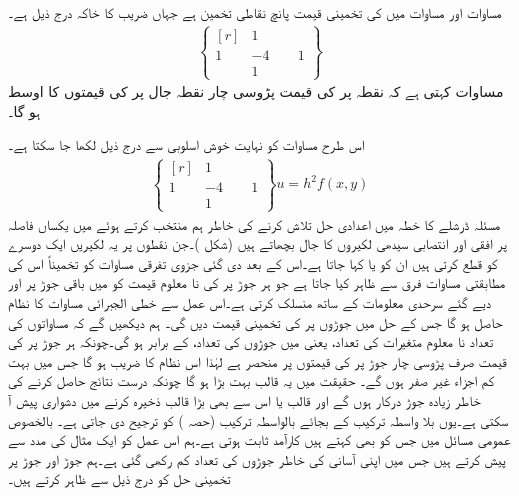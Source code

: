 مساوات  اور مساوات  میں  کی تخمینی قیمت پانچ نقاطی تخمین ہے جہاں   ضریب  کا خاکہ درج ذیل ہے۔
\begin{align}\label{مساوات_اعدادی_جزوی_عمومی_ح}
\left \{ \begin{matrix*}[r] &1&\\1&-4&\phantom{-}1\\&1& \end{matrix*}\right \}
\end{align}
مساوات  کہتی ہے کہ نقطہ  پر  کی قیمت  پڑوسی چار نقطہ جال پر  کی قیمتوں کا اوسط ہو گا۔

اس طرح مساوات  کو نہایت خوش اسلوبی سے درج ذیل لکھا جا سکتا ہے۔ 
\begin{align*}
\left \{ \begin{matrix*}[r] &1&\\1&-4&\phantom{-}1\\&1& \end{matrix*}\right \}u=h^2f(x,y)
\end{align*}
مسئلہ ڈرشلے  کا خطہ  میں اعدادی حل تلاش کرنے کی خاطر  ہم  منتخب کرتے ہوئے  میں  یکساں  فاصلہ پر افقی اور انتصابی  سیدھی لکیروں کا جال بچھاتے ہیں (شکل )۔جن نقطوں پر یہ لکیریں ایک دوسرے کو قطع کرتی ہیں ان  کو   یا  کہا جاتا ہے۔اس کے بعد دی گئی جزوی تفرقی مساوات کو تخمیناً اس کی مطابقتی مساوات فرق سے ظاہر کیا جاتا ہے جو ہر جوڑ پر  کی نا معلوم قیمت کو  میں باقی جوڑ پر اور دیے گئے سرحدی معلومات کے ساتھ منسلک کرتی ہے۔اس عمل سے خطی الجبرائی مساوات کا نظام حاصل ہو گا جس کے حل  میں  جوڑوں پر  کی تخمینی قیمت دیں گی۔ ہم دیکھیں گے کہ مساواتوں کی تعداد نا معلوم متغیرات کی تعداد، یعنی  میں جوڑوں کی تعداد، کے برابر ہو گی۔چونکہ ہر جوڑ پر  کی قیمت صرف پڑوسی چار جوڑ پر  کی قیمتوں پر منحصر ہے لہٰذا اس نظام کا  ضریب   ہو گا جس میں بہت کم اجزاء غیر صفر ہوں گے۔ حقیقت میں یہ قالب بہت بڑا ہو گا چونکہ درست نتائج حاصل کرنے کی خاطر زیادہ جوڑ درکار ہوں گے اور  قالب یا اس سے بھی بڑا قالب ذخیرہ کرنے میں دشواری پیش آ سکتی ہے۔یوں بلا واسطہ ترکیب کے بجائے  بالواسطہ ترکیب (حصہ ) کو ترجیح دی جاتی ہے۔ بالخصوص عمومی مسائل میں   جس کو  بھی کہتے ہیں کارآمد ثابت ہوتی ہے۔ہم اس عمل کو ایک مثال کی مدد سے پیش کرتے ہیں جس میں اپنی  آسانی کی خاطر جوڑوں کی تعداد کم رکھی گئی ہے۔ہم جوڑ اور جوڑ پر تخمینی حل کو درج ذیل سے ظاہر کرتے ہیں۔
